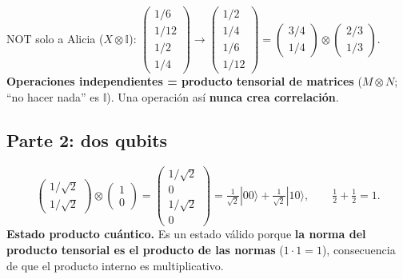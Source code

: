 \documentclass[11pt, a4paper, twoside, openright]{report}
\begin{document}
{NOT solo a Alicia ($X\otimes\mathbb{I}$): \quad $\begin{pmatrix}1/6\\1/12\\1/2\\1/4\end{pmatrix} \to \begin{pmatrix}1/2\\1/4\\1/6\\1/12\end{pmatrix} = \begin{pmatrix}3/4\\1/4\end{pmatrix}\otimes\begin{pmatrix}2/3\\1/3\end{pmatrix}$.}
{\textbf{Operaciones independientes = producto tensorial de matrices} ($M\otimes N$; ``no hacer nada'' es $\mathbb{I}$). Una operación así \textbf{nunca crea correlación}.}

\subsection{Parte 2: dos qubits}

{\[ \begin{pmatrix}1/\sqrt2\\1/\sqrt2\end{pmatrix}\otimes\begin{pmatrix}1\\0\end{pmatrix} = \begin{pmatrix}1/\sqrt2\\0\\1/\sqrt2\\0\end{pmatrix} = \tfrac{1}{\sqrt2}|00\rangle + \tfrac{1}{\sqrt2}|10\rangle, \qquad \tfrac12 + \tfrac12 = 1. \]}
{\textbf{Estado producto cuántico.} Es un estado válido porque \textbf{la norma del producto tensorial es el producto de las normas} ($1\cdot1 = 1$), consecuencia de que el producto interno es multiplicativo.}
\end{document}
